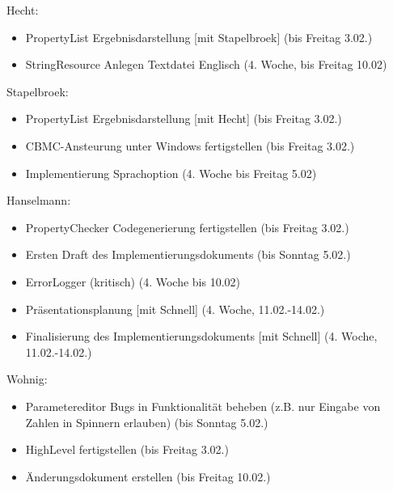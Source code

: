 \documentclass[a4paper]{scrreprt}
\begin{document}
\vspace{8mm}
Hecht: 
\begin{itemize}
\item PropertyList Ergebnisdarstellung [mit Stapelbroek] (bis Freitag 3.02.)
\item StringResource Anlegen Textdatei Englisch (4. Woche, bis Freitag 10.02)
\end{itemize} 
\vspace{8mm}
Stapelbroek:
\begin{itemize}
\item PropertyList Ergebnisdarstellung [mit Hecht] (bis Freitag 3.02.)
\item CBMC-Ansteurung unter Windows fertigstellen (bis Freitag 3.02.)
\item Implementierung Sprachoption (4. Woche bis Freitag 5.02)
\end{itemize}
\vspace{8mm}
Hanselmann:
\begin{itemize}
\item PropertyChecker Codegenerierung fertigstellen (bis Freitag 3.02.)
\item Ersten Draft des Implementierungsdokuments (bis Sonntag 5.02.)
\item ErrorLogger (kritisch) (4. Woche bis 10.02)
\item Präsentationsplanung [mit Schnell] (4. Woche, 11.02.-14.02.)
\item Finalisierung des Implementierungsdokuments [mit Schnell] (4. Woche, 11.02.-14.02.)
\end{itemize}
\vspace{8mm}
Wohnig:
\begin{itemize}
\item Parametereditor Bugs in Funktionalität beheben (z.B. nur Eingabe von Zahlen in Spinnern erlauben) (bis Sonntag 5.02.)
\item HighLevel fertigstellen (bis Freitag 3.02.)
\item Änderungsdokument erstellen (bis Freitag 10.02.)
\end{itemize}
\vspace{8mm}
\end{document}
